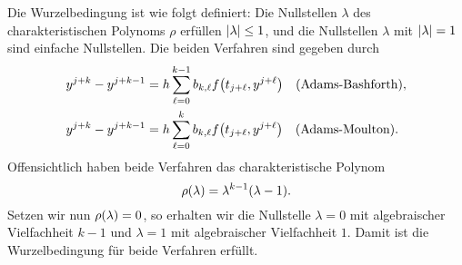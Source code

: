 \documentclass{exercise}
\begin{document}
    Die Wurzelbedingung ist wie folgt definiert:
    Die Nullstellen \(\lambda\) des charakteristischen Polynoms \(\rho\) erfüllen \(\absolute*{\lambda} \le 1\), und die Nullstellen \(\lambda\) mit \(\absolute*{\lambda} = 1\) sind einfache Nullstellen.
    Die beiden Verfahren sind gegeben durch
    \begin{align*}
        y^{j + k} - y^{j + k - 1} &= h\sum_{\ell = 0}^{k - 1}b_{k, \ell}f\parentheses*{t_{j + \ell}, y^{j + \ell}} \quad \text{(Adams-Bashforth)},\\
        y^{j + k} - y^{j + k - 1} &= h\sum_{\ell = 0}^k b_{k, \ell}f\parentheses*{t_{j + \ell}, y^{j + \ell}} \quad \text{(Adams-Moulton)}.
    \end{align*}
    Offensichtlich haben beide Verfahren das charakteristische Polynom
    \[
        \rho\parentheses*{\lambda} = \lambda^{k - 1}\parentheses*{\lambda - 1}.
    \]
    Setzen wir nun \(\rho\parentheses*{\lambda} = 0\), so erhalten wir die Nullstelle \(\lambda = 0\) mit algebraischer Vielfachheit \(k - 1\) und \(\lambda = 1\) mit algebraischer Vielfachheit \(1\). Damit ist die Wurzelbedingung für beide Verfahren erfüllt.

    
    
    \section{}
    
\end{document}
